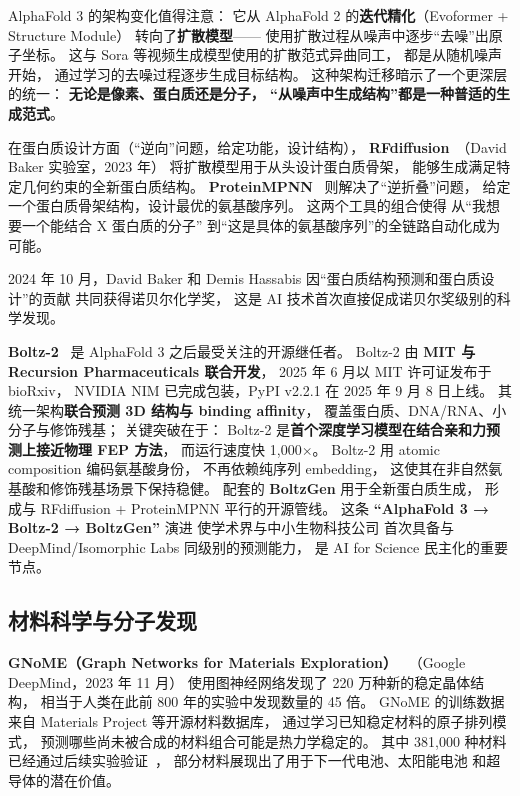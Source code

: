 AlphaFold 3 的架构变化值得注意：
它从 AlphaFold 2 的\textbf{迭代精化}（Evoformer + Structure Module）
转向了\textbf{扩散模型}——
使用扩散过程从噪声中逐步“去噪”出原子坐标。
这与 Sora 等视频生成模型使用的扩散范式异曲同工，
都是从随机噪声开始，
通过学习的去噪过程逐步生成目标结构。
这种架构迁移暗示了一个更深层的统一：
\textbf{无论是像素、蛋白质还是分子，
“从噪声中生成结构”都是一种普适的生成范式}。

在蛋白质设计方面（“逆向”问题，给定功能，设计结构），
\textbf{RFdiffusion}~\cite{watson2023rfdiffusion}（David Baker 实验室，2023 年）
将扩散模型用于从头设计蛋白质骨架，
能够生成满足特定几何约束的全新蛋白质结构。
\textbf{ProteinMPNN}~\cite{dauparas2022proteinmpnn}
则解决了“逆折叠”问题，
给定一个蛋白质骨架结构，设计最优的氨基酸序列。
这两个工具的组合使得
从“我想要一个能结合 X 蛋白质的分子”
到“这是具体的氨基酸序列”的全链路自动化成为可能。

2024 年 10 月，David Baker 和 Demis Hassabis
因“蛋白质结构预测和蛋白质设计”的贡献
共同获得诺贝尔化学奖，
这是 AI 技术首次直接促成诺贝尔奖级别的科学发现。

\textbf{Boltz-2}~\cite{boltz2_2026}
是 AlphaFold 3 之后最受关注的开源继任者。
Boltz-2 由 \textbf{MIT 与 Recursion Pharmaceuticals 联合开发}，
2025 年 6 月以 MIT 许可证发布于 bioRxiv，
NVIDIA NIM 已完成包装，PyPI v2.2.1 在 2025 年 9 月 8 日上线。
其统一架构\textbf{联合预测 3D 结构与 binding affinity}，
覆盖蛋白质、DNA/RNA、小分子与修饰残基；
关键突破在于：
Boltz-2 是\textbf{首个深度学习模型在结合亲和力预测上接近物理 FEP 方法}，
而运行速度快 1,000$\times$。
Boltz-2 用 atomic composition 编码氨基酸身份，
不再依赖纯序列 embedding，
这使其在非自然氨基酸和修饰残基场景下保持稳健。
配套的 \textbf{BoltzGen} 用于全新蛋白质生成，
形成与 RFdiffusion + ProteinMPNN 平行的开源管线。
这条 \textbf{“AlphaFold 3 → Boltz-2 → BoltzGen”} 演进
使学术界与中小生物科技公司
首次具备与 DeepMind/Isomorphic Labs 同级别的预测能力，
是 AI for Science 民主化的重要节点。

\subsection{材料科学与分子发现}

\textbf{GNoME（Graph Networks for Materials Exploration）}%
~\cite{merchant2023gnome}（Google DeepMind，2023 年 11 月）
使用图神经网络发现了 220 万种新的稳定晶体结构，
相当于人类在此前 800 年的实验中发现数量的 45 倍。
GNoME 的训练数据来自 Materials Project 等开源材料数据库，
通过学习已知稳定材料的原子排列模式，
预测哪些尚未被合成的材料组合可能是热力学稳定的。
其中 381,000 种材料已经通过后续实验验证~\cite{merchant2023gnome}，
部分材料展现出了用于下一代电池、太阳能电池
和超导体的潜在价值。


